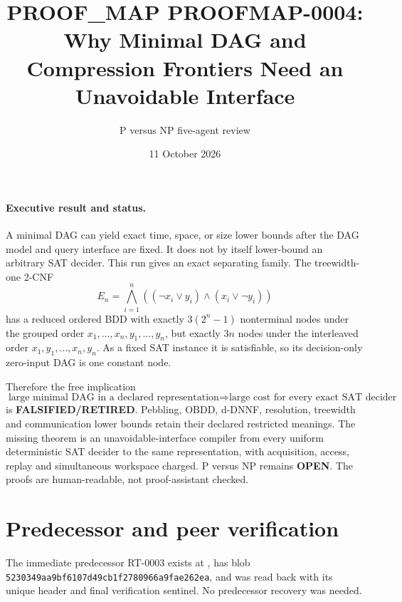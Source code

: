 \documentclass[11pt]{article}
\title{PROOF\_MAP PROOFMAP-0004:\\Why Minimal DAG and Compression Frontiers Need an Unavoidable Interface}
\author{P versus NP five-agent review}
\date{11 October 2026}
\begin{document}
\maketitle

\paragraph{Executive result and status.}
A minimal DAG can yield exact time, space, or size lower bounds after the DAG
model and query interface are fixed.  It does not by itself lower-bound an
arbitrary SAT decider.  This run gives an exact separating family.  The
treewidth-one 2-CNF
\[
 E_n=\bigwedge_{i=1}^{n}
 ((\neg x_i\vee y_i)\wedge(x_i\vee\neg y_i))
\]
has a reduced ordered BDD with exactly $3(2^n-1)$ nonterminal nodes under the
grouped order $x_1,\ldots,x_n,y_1,\ldots,y_n$, but exactly $3n$ nodes under
the interleaved order $x_1,y_1,\ldots,x_n,y_n$.  As a fixed SAT instance it
is satisfiable, so its decision-only zero-input DAG is one constant node.

Therefore the free implication
\[
 \text{large minimal DAG in a declared representation}
 \Longrightarrow
 \text{large cost for every exact SAT decider}
\]
is \textbf{FALSIFIED/RETIRED}.  Pebbling, OBDD, d-DNNF, resolution, treewidth
and communication lower bounds retain their declared restricted meanings.
The missing theorem is an unavoidable-interface compiler from every uniform
deterministic SAT decider to the same representation, with acquisition,
access, replay and simultaneous workspace charged.  P versus NP remains
\textbf{OPEN}.  The proofs are human-readable, not proof-assistant checked.

\section{Predecessor and peer verification}
The immediate predecessor RT-0003 exists at
, has blob
\texttt{5230349aa9bf6107d49cb1f2780966a9fae262ea}, and was read back with its
unique header and final verification sentinel.  No predecessor recovery was
needed.
\end{document}
